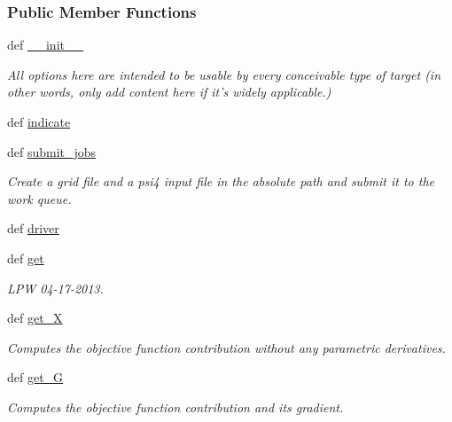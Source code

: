 \subsubsection*{\-Public \-Member \-Functions}
\begin{DoxyCompactItemize}
\item 
def \hyperlink{classforcebalance_1_1psi4io_1_1RDVR3__Psi4_afa204152dedeaf62137dd3f30e5f86ae}{\-\_\-\-\_\-init\-\_\-\-\_\-}
\begin{DoxyCompactList}\small\item\em \-All options here are intended to be usable by every conceivable type of target (in other words, only add content here if it's widely applicable.) \end{DoxyCompactList}\item 
def \hyperlink{classforcebalance_1_1psi4io_1_1RDVR3__Psi4_a27735c91ca9ae70cb32552396a8485ac}{indicate}
\item 
def \hyperlink{classforcebalance_1_1psi4io_1_1RDVR3__Psi4_a728adb334e4ad6e26200c265fc2f351a}{submit\-\_\-jobs}
\begin{DoxyCompactList}\small\item\em \-Create a grid file and a psi4 input file in the absolute path and submit it to the work queue. \end{DoxyCompactList}\item 
def \hyperlink{classforcebalance_1_1psi4io_1_1RDVR3__Psi4_a8c4cf7a59ef8714519631145669a5df9}{driver}
\item 
def \hyperlink{classforcebalance_1_1psi4io_1_1RDVR3__Psi4_a70936cb704ab5df307013cc6aa5b85c8}{get}
\begin{DoxyCompactList}\small\item\em \-L\-P\-W 04-\/17-\/2013. \end{DoxyCompactList}\item 
def \hyperlink{classforcebalance_1_1target_1_1Target_a606dd136f195c267c05a2455405e5949}{get\-\_\-\-X}
\begin{DoxyCompactList}\small\item\em \-Computes the objective function contribution without any parametric derivatives. \end{DoxyCompactList}\item 
def \hyperlink{classforcebalance_1_1target_1_1Target_afa8cc38c8bba8861c072e789717aa049}{get\-\_\-\-G}
\begin{DoxyCompactList}\small\item\em \-Computes the objective function contribution and its gradient. \end{DoxyCompactList}\item 

\end{DoxyCompactItemize}
